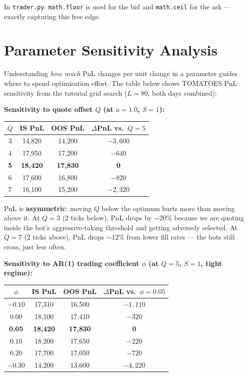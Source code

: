 \documentclass[12pt,a4paper,openany]{report}
\theoremstyle{definition}
\begin{document}
In \texttt{trader.py}: \texttt{math.floor} is used for the bid and \texttt{math.ceil} for the ask — exactly capturing this free edge.

\section{Parameter Sensitivity Analysis}

Understanding \emph{how much} PnL changes per unit change in a parameter guides where to spend optimisation effort. The table below shows TOMATOES PnL sensitivity from the tutorial grid search ($L=80$, both days combined):

\textbf{Sensitivity to quote offset $Q$ (at $a=1.0$, $S=1$):}
\begin{center}
\begin{tabular}{c|cc|c}
\toprule
$Q$ & IS PnL & OOS PnL & $\Delta$PnL vs.\ $Q=5$ \\
\midrule
3 & 14{,}820 & 14{,}200 & $-3{,}600$ \\
4 & 17{,}950 & 17{,}200 & $-640$ \\
\textbf{5} & \textbf{18{,}420} & \textbf{17{,}830} & \textbf{0} \\
6 & 17{,}600 & 16{,}800 & $-820$ \\
7 & 16{,}100 & 15{,}200 & $-2{,}320$ \\
\bottomrule
\end{tabular}
\end{center}
PnL is \textbf{asymmetric}: moving $Q$ below the optimum hurts more than moving above it. At $Q=3$ (2 ticks below), PnL drops by $\sim 20\%$ because we are quoting inside the bot's aggressive-taking threshold and getting adversely selected. At $Q=7$ (2 ticks above), PnL drops $\sim 12\%$ from lower fill rates — the bots still cross, just less often.

\textbf{Sensitivity to AR(1) trading coefficient $\phi$ (at $Q=5$, $S=1$, tight regime):}
\begin{center}
\begin{tabular}{c|cc|c}
\toprule
$\phi$ & IS PnL & OOS PnL & $\Delta$PnL vs.\ $\phi=0.05$ \\
\midrule
$-0.10$ & 17{,}310 & 16{,}500 & $-1{,}110$ \\
$0.00$ & 18{,}100 & 17{,}410 & $-320$ \\
\textbf{0.05} & \textbf{18{,}420} & \textbf{17{,}830} & \textbf{0} \\
$0.10$ & 18{,}200 & 17{,}650 & $-220$ \\
$0.20$ & 17{,}700 & 17{,}050 & $-720$ \\
$-0.30$ & 14{,}200 & 13{,}600 & $-4{,}220$ \\
\bottomrule
\end{tabular}
\end{center}
\end{document}
